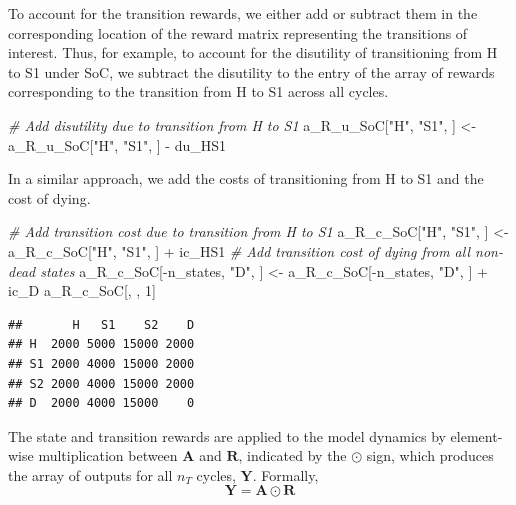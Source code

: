 \documentclass[
]{article}
\newenvironment{Shaded}{\begin{snugshade}}{\end{snugshade}}
\newcommand{\CommentTok}[1]{\textcolor[rgb]{0.56,0.35,0.01}{\textit{#1}}}
\newcommand{\DecValTok}[1]{\textcolor[rgb]{0.00,0.00,0.81}{#1}}
\newcommand{\NormalTok}[1]{#1}
\newcommand{\OtherTok}[1]{\textcolor[rgb]{0.56,0.35,0.01}{#1}}
\newcommand{\SpecialCharTok}[1]{\textcolor[rgb]{0.00,0.00,0.00}{#1}}
\newcommand{\StringTok}[1]{\textcolor[rgb]{0.31,0.60,0.02}{#1}}
\begin{document}
To account for the transition rewards, we either add or subtract them in the corresponding location of the reward matrix representing the transitions of interest. Thus, for example, to account for the disutility of transitioning from H to S1 under SoC, we subtract the disutility to the entry of the array of rewards corresponding to the transition from H to S1 across all cycles.

\begin{Shaded}
\begin{Highlighting}[]
\CommentTok{\# Add disutility due to transition from H to S1}
\NormalTok{a\_R\_u\_SoC[}\StringTok{"H"}\NormalTok{, }\StringTok{"S1"}\NormalTok{, ] }\OtherTok{\textless{}{-}}\NormalTok{ a\_R\_u\_SoC[}\StringTok{"H"}\NormalTok{, }\StringTok{"S1"}\NormalTok{, ] }\SpecialCharTok{{-}}\NormalTok{ du\_HS1}
\end{Highlighting}
\end{Shaded}

In a similar approach, we add the costs of transitioning from H to S1 and the cost of dying.

\begin{Shaded}
\begin{Highlighting}[]
\CommentTok{\# Add transition cost due to transition from H to S1}
\NormalTok{a\_R\_c\_SoC[}\StringTok{"H"}\NormalTok{, }\StringTok{"S1"}\NormalTok{, ] }\OtherTok{\textless{}{-}}\NormalTok{ a\_R\_c\_SoC[}\StringTok{"H"}\NormalTok{, }\StringTok{"S1"}\NormalTok{, ] }\SpecialCharTok{+}\NormalTok{ ic\_HS1}
\CommentTok{\# Add transition cost of dying from all non{-}dead states}
\NormalTok{a\_R\_c\_SoC[}\SpecialCharTok{{-}}\NormalTok{n\_states, }\StringTok{"D"}\NormalTok{, ] }\OtherTok{\textless{}{-}}\NormalTok{ a\_R\_c\_SoC[}\SpecialCharTok{{-}}\NormalTok{n\_states, }\StringTok{"D"}\NormalTok{, ] }\SpecialCharTok{+}\NormalTok{ ic\_D}
\NormalTok{a\_R\_c\_SoC[, , }\DecValTok{1}\NormalTok{]}
\end{Highlighting}
\end{Shaded}

\begin{verbatim}
##       H   S1    S2    D
## H  2000 5000 15000 2000
## S1 2000 4000 15000 2000
## S2 2000 4000 15000 2000
## D  2000 4000 15000    0
\end{verbatim}

The state and transition rewards are applied to the model dynamics by element-wise multiplication between \(\mathbf{A}\) and \(\mathbf{R}\), indicated by the \(\odot\) sign, which produces the array of outputs for all \(n_T\) cycles, \(\mathbf{Y}\). Formally,
\begin{equation}
  \mathbf{Y} = \mathbf{A} \odot \mathbf{R}
  \label{eq:array-outputs}
\end{equation}
\end{document}
